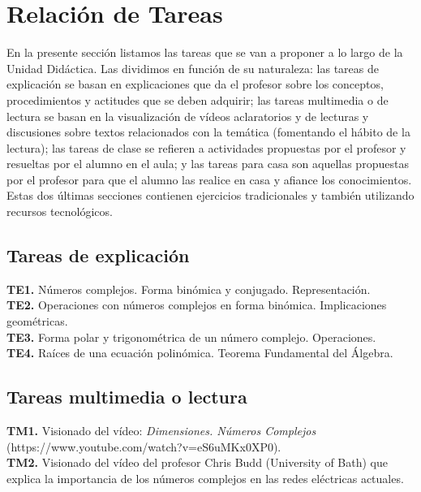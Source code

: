 \documentclass[../main.tex]{memoir}
\begin{document}
\chapter{Relación de Tareas}
\label{sec:tareas}

En la presente sección listamos las tareas que se van a proponer a lo largo de la Unidad Didáctica. Las dividimos en función de su naturaleza: las tareas de explicación se basan en explicaciones que da el profesor sobre los conceptos, procedimientos y actitudes que se deben adquirir; las tareas multimedia o de lectura se basan en la visualización de vídeos aclaratorios y de lecturas y discusiones sobre textos relacionados con la temática (fomentando el hábito de la lectura); las tareas de clase se refieren a actividades propuestas por el profesor y resueltas por el alumno en el aula; y las tareas para casa son aquellas propuestas por el profesor para que el alumno las realice en casa y afiance los conocimientos. Estas dos últimas secciones contienen ejercicios tradicionales y también utilizando recursos tecnológicos.

\section{Tareas de explicación}

\textbf{TE1.} Números complejos. Forma binómica y conjugado. Representación. \\

\textbf{TE2.} Operaciones con números complejos en forma binómica. Implicaciones geométricas. \\

\textbf{TE3.} Forma polar y trigonométrica de un número complejo. Operaciones. \\

\textbf{TE4.} Raíces de una ecuación polinómica. Teorema Fundamental del Álgebra. \\


\section{Tareas multimedia o lectura}

\textbf{TM1.} Visionado del vídeo: \textit{Dimensiones. Números Complejos} \\(https://www.youtube.com/watch?v=eS6uMKx0XP0). \\

\textbf{TM2.} Visionado del vídeo del profesor Chris Budd (University of Bath) que explica la importancia de los números complejos en las redes eléctricas actuales. \\
\end{document}
